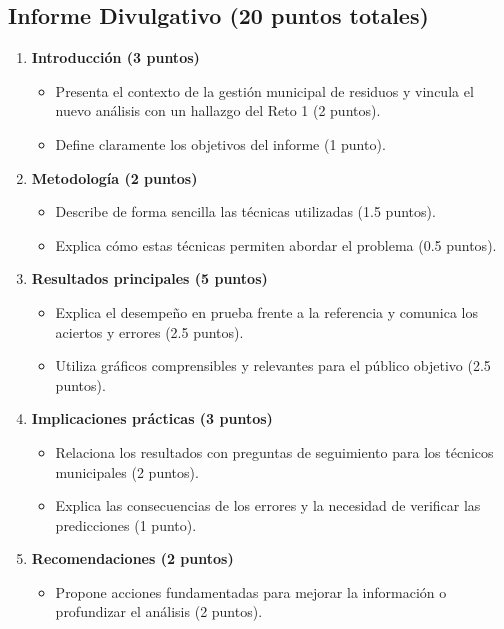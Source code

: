 \documentclass[a4,11pt]{aleph-notas}
\begin{document}
\subsection*{Informe Divulgativo (20 puntos totales)}
\begin{enumerate}[leftmargin=*, label=\textbf{\arabic*.}]
    \item \textbf{Introducción (3 puntos)}
    \begin{itemize}[leftmargin=*]
        \item Presenta el contexto de la gestión municipal de residuos y vincula el nuevo análisis con un hallazgo del Reto 1 (2 puntos).
        \item Define claramente los objetivos del informe (1 punto).
    \end{itemize}

    \item \textbf{Metodología (2 puntos)}
    \begin{itemize}[leftmargin=*]
        \item Describe de forma sencilla las técnicas utilizadas (1.5 puntos).
        \item Explica cómo estas técnicas permiten abordar el problema (0.5 puntos).
    \end{itemize}

    \item \textbf{Resultados principales (5 puntos)}
    \begin{itemize}[leftmargin=*]
        \item Explica el desempeño en prueba frente a la referencia y comunica los aciertos y errores (2.5 puntos).
        \item Utiliza gráficos comprensibles y relevantes para el público objetivo (2.5 puntos).
    \end{itemize}

    \item \textbf{Implicaciones prácticas (3 puntos)}
    \begin{itemize}[leftmargin=*]
        \item Relaciona los resultados con preguntas de seguimiento para los técnicos municipales (2 puntos).
        \item Explica las consecuencias de los errores y la necesidad de verificar las predicciones (1 punto).
    \end{itemize}

    \item \textbf{Recomendaciones (2 puntos)}
    \begin{itemize}[leftmargin=*]
        \item Propone acciones fundamentadas para mejorar la información o profundizar el análisis (2 puntos).
    \end{itemize}


\end{enumerate}
\end{document}

